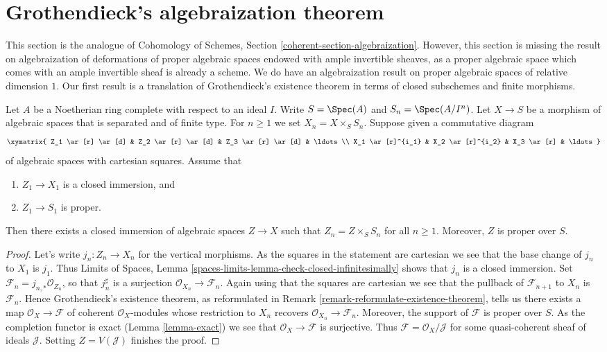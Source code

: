 \section{Grothendieck's algebraization theorem}
\label{section-algebraization}

\noindent
This section is the analogue of
Cohomology of Schemes, Section \ref{coherent-section-algebraization}.
However, this section is missing the result on algebraization of deformations
of proper algebraic spaces endowed with ample invertible sheaves, as a
proper algebraic space which comes with an ample invertible sheaf is
already a scheme. We do have an algebraization result on proper
algebraic spaces of relative dimension $1$.
Our first result is a translation of Grothendieck's existence
theorem in terms of closed subschemes and finite morphisms.

\begin{lemma}
\label{lemma-algebraize-formal-closed-subscheme}
Let $A$ be a Noetherian ring complete with respect to an ideal $I$.
Write $S = \Spec(A)$ and $S_n = \Spec(A/I^n)$.
Let $X \to S$ be a morphism of algebraic spaces that is separated
and of finite type.
For $n \geq 1$ we set $X_n = X \times_S S_n$.
Suppose given a commutative diagram
$$
\xymatrix{
Z_1 \ar[r] \ar[d] & Z_2 \ar[r] \ar[d] & Z_3 \ar[r] \ar[d] & \ldots \\
X_1 \ar[r]^{i_1} & X_2 \ar[r]^{i_2} & X_3 \ar[r] & \ldots
}
$$
of algebraic spaces with cartesian squares. Assume that
\begin{enumerate}
\item $Z_1 \to X_1$ is a closed immersion, and
\item $Z_1 \to S_1$ is proper.
\end{enumerate}
Then there exists a closed immersion of algebraic spaces $Z \to X$ such that
$Z_n = Z \times_S S_n$ for all $n \geq 1$. Moreover, $Z$ is proper over $S$.
\end{lemma}

\begin{proof}
Let's write $j_n : Z_n \to X_n$ for the vertical morphisms.
As the squares in the statement are cartesian
we see that the base change of $j_n$ to $X_1$ is $j_1$.
Thus Limits of Spaces, Lemma
\ref{spaces-limits-lemma-check-closed-infinitesimally}
shows that $j_n$ is a closed immersion.
Set $\mathcal{F}_n = j_{n, *}\mathcal{O}_{Z_n}$, so that
$j_n^\sharp$ is a surjection $\mathcal{O}_{X_n} \to \mathcal{F}_n$.
Again using that the squares are cartesian we see that
the pullback of $\mathcal{F}_{n + 1}$ to $X_n$ is $\mathcal{F}_n$.
Hence Grothendieck's existence theorem, as reformulated in
Remark \ref{remark-reformulate-existence-theorem},
tells us there exists a map
$\mathcal{O}_X \to \mathcal{F}$
of coherent $\mathcal{O}_X$-modules whose restriction to
$X_n$ recovers $\mathcal{O}_{X_n} \to \mathcal{F}_n$.
Moreover, the support of $\mathcal{F}$ is proper over $S$.
As the completion functor is exact (Lemma \ref{lemma-exact})
we see that $\mathcal{O}_X \to \mathcal{F}$
is surjective. Thus $\mathcal{F} = \mathcal{O}_X/\mathcal{J}$
for some quasi-coherent sheaf of ideals $\mathcal{J}$.
Setting $Z = V(\mathcal{J})$ finishes the proof.
\end{proof}

